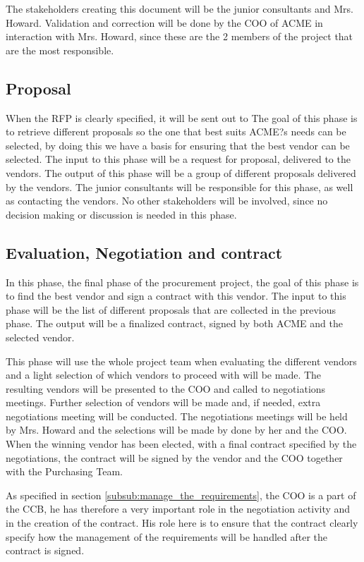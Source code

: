 \documentclass[a4paper]{article}
\begin{document}
The stakeholders creating this document will be the junior consultants and Mrs. Howard. Validation and correction will be done by the COO of ACME in interaction with Mrs. Howard, since these are the 2 members of the project that are the most responsible.

\subsection{Proposal}
\label{sub:proposal}
When the RFP is clearly specified, it will be sent out to 
The goal of this phase is to retrieve different proposals so the one that best suits ACME?s needs can be selected, by doing this we have a basis for ensuring that the best vendor can be selected. The input to this phase will be a request for proposal, delivered to the vendors. The output of this phase will be a group of different proposals delivered by the vendors. The junior consultants will be responsible for this phase, as well as contacting the vendors. No other stakeholders will be involved, since no decision making or discussion is needed in this phase.

\subsection{Evaluation, Negotiation and contract}
\label{sub:evaluation_negotiation_and_contract}
In this phase, the final phase of the procurement project, the goal of this phase is to find the best vendor and sign a contract with this vendor. The input to this phase will be the list of different proposals that are collected in the previous phase. The output will be a finalized contract, signed by both ACME and the selected vendor. 

This phase will use the whole project team when evaluating the different vendors and a light selection of which vendors to proceed with will be made. The resulting vendors will be presented to the COO and called to negotiations meetings. Further selection of vendors will be made and, if needed, extra negotiations meeting will be conducted. The negotiations meetings will be held by Mrs. Howard and the selections will be made by done by her and the COO. When the winning vendor has been elected, with a final contract specified by the negotiations, the contract will be signed by the vendor and the COO together with the Purchasing Team.

As specified in section \ref{subsub:manage_the_requirements}, the COO is a part of the CCB, he has therefore a very important role in the negotiation activity and in the creation of the contract. His role here is to ensure that the contract clearly specify how the management of the requirements will be handled after the contract is signed.
 
\end{document}
